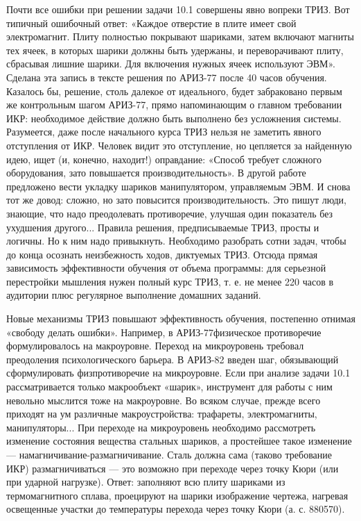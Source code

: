 Почти  все  ошибки при  решении  задачи  10.1 совершены  явно  вопреки
ТРИЗ.  Вот  типичный  ошибочный   ответ:  «Каждое  отверстие  в  плите
имеет свой  электромагнит. Плиту  полностью покрывают  шариками, затем
включают магниты тех  ячеек, в которых шарики должны  быть удержаны, и
переворачивают плиту,  сбрасывая лишние  шарики. Для  включения нужных
ячеек используют ЭВМ». Сделана эта  запись в тексте решения по АРИЗ-77
после  40  часов обучения.  Казалось  бы,  решение, столь  далекое  от
идеального,  будет забраковано  первым же  контрольным шагом  АРИЗ-77,
прямо  напоминающим о  главном  требовании  ИКР: необходимое  действие
должно быть  выполнено без усложнения системы.  Разумеется, даже после
начального курса  ТРИЗ нельзя не  заметить явного отступления  от ИКР.
Человек  видит  это  отступление,  но  цепляется  за  найденную  идею,
ищет  (и,  конечно,  находит!) оправдание:  «Способ  требует  сложного
оборудования,  зато повышается  производительность».  В другой  работе
предложено  вести укладку  шариков манипулятором,  управляемым ЭВМ.  И
снова тот же довод: сложно,  но зато повысится производительность. Это
пишут люди, знающие, что  надо преодолевать противоречие, улучшая один
показатель  без ухудшения  другого... Правила  решения, предписываемые
ТРИЗ, просты и логичны. Но к ним надо привыкнуть. Необходимо разобрать
сотни  задач, чтобы  до конца  осознать неизбежность  ходов, диктуемых
ТРИЗ.  Отсюда  прямая  зависимость эффективности  обучения  от  объема
программы: для серьезной перестройки  мышления нужен полный курс ТРИЗ,
т.  е. не  менее  220  часов в  аудитории  плюс регулярное  выполнение
домашних заданий.

Новые  механизмы  ТРИЗ  повышают  эффективность  обучения,  постепенно
отнимая  «свободу   делать  ошибки».  Например,   в  АРИЗ-77физическое
противоречие формулировалось  на макроуровне. Переход  на микроуровень
требовал  преодоления  психологического   барьера.  В  АРИЗ-82  введен
шаг,  обязывающий   сформулировать  физпротиворечие   на  микроуровне.
Если  при  анализе  задачи  10.1  рассматривается  только  макрообъект
«шарик»,  инструмент   для  работы   с  ним  невольно   мыслится  тоже
на  макроуровне.  Во  всяком  случае,  прежде  всего  приходят  на  ум
различные макроустройства:  трафареты, электромагниты, манипуляторы...
При   переходе  на   микроуровень  необходимо   рассмотреть  изменение
состояния вещества  стальных шариков,  а простейшее такое  изменение —
намагничивание-размагничивание. Сталь  должна сама  (таково требование
ИКР) размагничиваться  — это  возможно при  переходе через  точку Кюри
(или при  ударной нагрузке).  Ответ: заполняют  всю плиту  шариками из
термомагнитного  сплава,  проецируют  на шарики  изображение  чертежа,
нагревая освещенные  участки до температуры перехода  через точку Кюри
(а. с. 880570).


